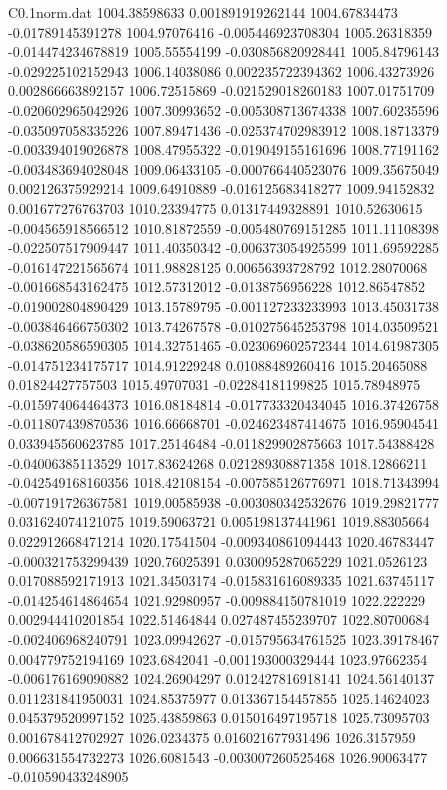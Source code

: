 \begin{filecontents}{C0.1norm.dat}
1004.38598633		0.001891919262144
1004.67834473		-0.01789145391278
1004.97076416		-0.005446923708304
1005.26318359		-0.014474234678819
1005.55554199		-0.030856820928441
1005.84796143		-0.029225102152943
1006.14038086		0.002235722394362
1006.43273926		0.002866663892157
1006.72515869		-0.021529018260183
1007.01751709		-0.020602965042926
1007.30993652		-0.005308713674338
1007.60235596		-0.035097058335226
1007.89471436		-0.025374702983912
1008.18713379		-0.003394019026878
1008.47955322		-0.019049155161696
1008.77191162		-0.003483694028048
1009.06433105		-0.000766440523076
1009.35675049		0.002126375929214
1009.64910889		-0.016125683418277
1009.94152832		0.001677276763703
1010.23394775		0.01317449328891
1010.52630615		-0.004565918566512
1010.81872559		-0.005480769151285
1011.11108398		-0.022507517909447
1011.40350342		-0.006373054925599
1011.69592285		-0.016147221565674
1011.98828125		0.00656393728792
1012.28070068		-0.001668543162475
1012.57312012		-0.0138756956228
1012.86547852		-0.019002804890429
1013.15789795		-0.001127233233993
1013.45031738		-0.003846466750302
1013.74267578		-0.010275645253798
1014.03509521		-0.038620586590305
1014.32751465		-0.023069602572344
1014.61987305		-0.014751234175717
1014.91229248		0.01088489260416
1015.20465088		0.01824427757503
1015.49707031		-0.02284181199825
1015.78948975		-0.015974064464373
1016.08184814		-0.017733320434045
1016.37426758		-0.011807439870536
1016.66668701		-0.024623487414675
1016.95904541		0.033945560623785
1017.25146484		-0.011829902875663
1017.54388428		-0.04006385113529
1017.83624268		0.021289308871358
1018.12866211		-0.042549168160356
1018.42108154		-0.007585126776971
1018.71343994		-0.007191726367581
1019.00585938		-0.003080342532676
1019.29821777		0.031624074121075
1019.59063721		0.005198137441961
1019.88305664		0.022912668471214
1020.17541504		-0.009340861094443
1020.46783447		-0.000321753299439
1020.76025391		0.030095287065229
1021.0526123		0.017088592171913
1021.34503174		-0.015831616089335
1021.63745117		-0.014254614864654
1021.92980957		-0.009884150781019
1022.222229		0.002944410201854
1022.51464844		0.027487455239707
1022.80700684		-0.002406968240791
1023.09942627		-0.015795634761525
1023.39178467		0.004779752194169
1023.6842041		-0.001193000329444
1023.97662354		-0.006176169090882
1024.26904297		0.012427816918141
1024.56140137		0.011231841950031
1024.85375977		0.013367154457855
1025.14624023		0.045379520997152
1025.43859863		0.015016497195718
1025.73095703		0.001678412702927
1026.0234375		0.016021677931496
1026.3157959		0.006631554732273
1026.6081543		-0.003007260525468
1026.90063477		-0.010590433248905

\end{filecontents}
